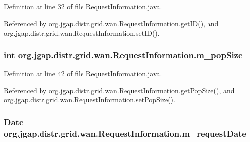 Definition at line 32 of file Request\-Information.\-java.



Referenced by org.\-jgap.\-distr.\-grid.\-wan.\-Request\-Information.\-get\-I\-D(), and org.\-jgap.\-distr.\-grid.\-wan.\-Request\-Information.\-set\-I\-D().

\hypertarget{classorg_1_1jgap_1_1distr_1_1grid_1_1wan_1_1_request_information_ad2eefa8c8dae036e1cf9dfbc0a49912c}{
\subsubsection[{m\-\_\-pop\-Size}]{\setlength{\rightskip}{0pt plus 5cm}int org.\-jgap.\-distr.\-grid.\-wan.\-Request\-Information.\-m\-\_\-pop\-Size\hspace{0.3cm}{\ttfamily [private]}}}\label{classorg_1_1jgap_1_1distr_1_1grid_1_1wan_1_1_request_information_ad2eefa8c8dae036e1cf9dfbc0a49912c}


Definition at line 42 of file Request\-Information.\-java.



Referenced by org.\-jgap.\-distr.\-grid.\-wan.\-Request\-Information.\-get\-Pop\-Size(), and org.\-jgap.\-distr.\-grid.\-wan.\-Request\-Information.\-set\-Pop\-Size().

\hypertarget{classorg_1_1jgap_1_1distr_1_1grid_1_1wan_1_1_request_information_ab12b4a78411ad2448c2c0c17ed870c7a}{
\subsubsection[{m\-\_\-request\-Date}]{\setlength{\rightskip}{0pt plus 5cm}Date org.\-jgap.\-distr.\-grid.\-wan.\-Request\-Information.\-m\-\_\-request\-Date\hspace{0.3cm}{\ttfamily [private]}}}\label{classorg_1_1jgap_1_1distr_1_1grid_1_1wan_1_1_request_information_ab12b4a78411ad2448c2c0c17ed870c7a}


